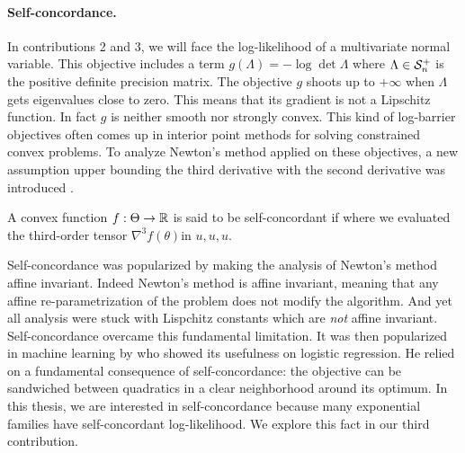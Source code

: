 \paragraph{Self-concordance.}
In contributions 2 and 3, we will face the log-likelihood of a multivariate normal variable.
This objective includes a term $g(\Lambda) = -\log \det \Lambda$ where $\Lambda\in {\mathcal S}_n^+$ is the positive definite precision matrix.
The objective $g$ shoots up to $+\infty$ when $\Lambda$ gets eigenvalues close to zero.
This means that its gradient is not a Lipschitz function.
In fact  $g$ is neither smooth nor strongly convex.
This kind of log-barrier objectives often comes up in interior point methods for solving constrained convex problems.
To analyze Newton's method applied on these objectives, a new assumption upper bounding the third derivative with the second derivative was introduced \citep{nemirovski1983problem}.
\begin{definition}
	\citep[definition 4.1.1]{nesterov2004Intro}
	A convex function $f:\Theta \rightarrow\mathbb{R}$ is said to be self-concordant if
	where we evaluated the third-order tensor $\nabla^3 f(\theta)$in $u,u,u$.
\end{definition}
Self-concordance was popularized by making the analysis of Newton's method affine invariant.
Indeed Newton's method is affine invariant, meaning that any affine re-parametrization of the problem does not modify the algorithm.
And yet all analysis were stuck with Lispchitz constants which are \emph{not} affine invariant.
Self-concordance overcame this fundamental limitation.
It was then popularized in machine learning by \citet{bach2010self} who showed its usefulness on logistic regression.
He relied on a fundamental consequence of self-concordance: the objective can be sandwiched between quadratics in a clear neighborhood around its optimum.
In this thesis, we are interested in self-concordance because many exponential families have self-concordant log-likelihood. 
We explore this fact in our third contribution.

